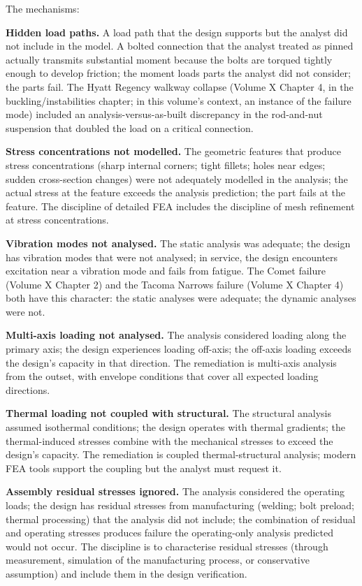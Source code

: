 The mechanisms:

\textbf{Hidden load paths.} A load path that the design supports but the analyst did not include in the model. A bolted connection that the analyst treated as pinned actually transmits substantial moment because the bolts are torqued tightly enough to develop friction; the moment loads parts the analyst did not consider; the parts fail. The Hyatt Regency walkway collapse (Volume X Chapter 4, in the buckling/instabilities chapter; in this volume's context, an instance of the failure mode) included an analysis-versus-as-built discrepancy in the rod-and-nut suspension that doubled the load on a critical connection.

\textbf{Stress concentrations not modelled.} The geometric features that produce stress concentrations (sharp internal corners; tight fillets; holes near edges; sudden cross-section changes) were not adequately modelled in the analysis; the actual stress at the feature exceeds the analysis prediction; the part fails at the feature. The discipline of detailed FEA includes the discipline of mesh refinement at stress concentrations.

\textbf{Vibration modes not analysed.} The static analysis was adequate; the design has vibration modes that were not analysed; in service, the design encounters excitation near a vibration mode and fails from fatigue. The Comet failure (Volume X Chapter 2) and the Tacoma Narrows failure (Volume X Chapter 4) both have this character: the static analyses were adequate; the dynamic analyses were not.

\textbf{Multi-axis loading not analysed.} The analysis considered loading along the primary axis; the design experiences loading off-axis; the off-axis loading exceeds the design's capacity in that direction. The remediation is multi-axis analysis from the outset, with envelope conditions that cover all expected loading directions.

\textbf{Thermal loading not coupled with structural.} The structural analysis assumed isothermal conditions; the design operates with thermal gradients; the thermal-induced stresses combine with the mechanical stresses to exceed the design's capacity. The remediation is coupled thermal-structural analysis; modern FEA tools support the coupling but the analyst must request it.

\textbf{Assembly residual stresses ignored.} The analysis considered the operating loads; the design has residual stresses from manufacturing (welding; bolt preload; thermal processing) that the analysis did not include; the combination of residual and operating stresses produces failure the operating-only analysis predicted would not occur. The discipline is to characterise residual stresses (through measurement, simulation of the manufacturing process, or conservative assumption) and include them in the design verification.

